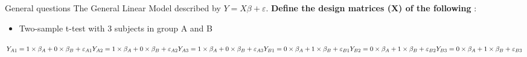 \documentclass{beamer}
\begin{document}
    
\begin{frame}{General questions}  
The General Linear Model described by $Y=X\beta+\varepsilon$. \textbf{Define the design matrices (X) of the following} :
  
      \begin{itemize}
	\item Two-sample t-test with 3 subjects in group A and B
      \end{itemize}
	
      \begin{center}
	$
	Y_{A1} = 1 \times \beta_{A} + 0 \times \beta_{B} + \varepsilon_{A1} \linebreak 
	Y_{A2} = 1 \times \beta_{A} + 0 \times \beta_{B} + \varepsilon_{A2} \linebreak 
	Y_{A3} = 1 \times \beta_{A} + 0 \times \beta_{B} + \varepsilon_{A3} \linebreak
	Y_{B1} = 0 \times \beta_{A} + 1 \times \beta_{B} + \varepsilon_{B1} \linebreak 
	Y_{B2} = 0 \times \beta_{A} + 1 \times \beta_{B} + \varepsilon_{B2} \linebreak 
	Y_{B3} = 0 \times \beta_{A} + 1 \times \beta_{B} + \varepsilon_{B3} \linebreak 
	$
      \end{center}
\end{frame}
\end{document}
